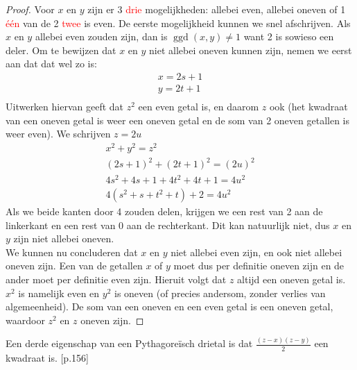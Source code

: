 \documentclass[12pt,reqno]{article}
\theoremstyle{theorem}
\theoremstyle{definition}
\DeclareMathOperator{\ggd}{ggd}
\begin{document}
	\begin{proof}
		Voor $x$ en $y$ zijn er 3 \textcolor{red}{drie} mogelijkheden: allebei even, allebei oneven of 1 \textcolor{red}{\'e\'en} van de 2 \textcolor{red}{twee} is even. De eerste mogelijkheid kunnen we snel afschrijven. Als $x$ en $y$ allebei even zouden zijn, dan is $\ggd(x,y) \neq 1$ want 2 is sowieso een deler. Om te bewijzen dat $x$ en $y$ niet allebei oneven kunnen zijn, nemen we eerst aan dat dat wel zo is:
		\begin{align*}
			x = 2s + 1\\
			y = 2t + 1\\
		\end{align*}
		Uitwerken hiervan geeft dat $z^2$ een even getal is, en daarom $z$ ook (het kwadraat van een oneven getal is weer een oneven getal en de som van 2 oneven getallen is weer even). We schrijven $z = 2u$
		\begin{align*}
			x^2 + y^2 = z^2\\
			(2s + 1)^2 + (2t + 1)^2 = (2u)^2\\
			4s^2 + 4s + 1 +4t^2 + 4t + 1 = 4u^2\\
			4(s^2 + s + t^2 + t) + 2 = 4u^2
		\end{align*}
		Als we beide kanten door 4 zouden delen, krijgen we een rest van 2 aan de linkerkant en een rest van 0 aan de rechterkant. Dit kan natuurlijk niet, dus $x$ en $y$ zijn niet allebei oneven. \\
		We kunnen nu concluderen dat $x$ en $y$ niet allebei even zijn, en ook niet allebei oneven zijn. Een van de getallen $x$ of $y$ moet dus per definitie oneven zijn en de ander moet per definitie even zijn. Hieruit volgt dat $z$ altijd een oneven getal is. $x^2$ is namelijk even en $y^2$ is oneven (of precies andersom, zonder verlies van algemeenheid). De som van een oneven en een even getal is een oneven getal, waardoor $z^2$ en $z$ oneven zijn.
	\end{proof}
	Een derde eigenschap van een Pythagore\"isch drietal is dat $\frac{(z-x)(z-y)}{2}$ een kwadraat is. \cite{Posamentier}[p.156]
	
\end{document}
